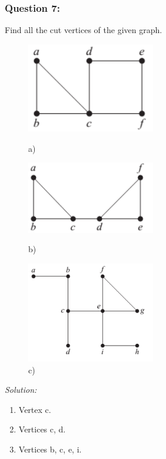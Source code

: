 \documentclass[a4paper]{article}
\begin{document}
	\subsubsection*{Question 7:}
	Find all the cut vertices of the given graph.
	\begin{figure}[H]
		\begin{minipage}{0.3\textwidth}
			\centering
			\includegraphics[width=0.5\textwidth]{tut97_1.png}
			\caption*{a)}
		\end{minipage}
		\begin{minipage}{0.3\textwidth}
			\centering
			\includegraphics[width=0.5\textwidth]{tut97_2.png}
			\caption*{b)}
		\end{minipage}
		\begin{minipage}{0.3\textwidth}
			\centering
			\includegraphics[width=0.5\textwidth]{tut97_3.png}
			\caption*{c)}
		\end{minipage}
	\end{figure}
	\emph{Solution:} \\
	\begin{enumerate}[label = \alph*)]
		\item Vertex c.
		\item Vertices c, d.
		\item Vertices b, c, e, i.
	\end{enumerate}
\end{document}

